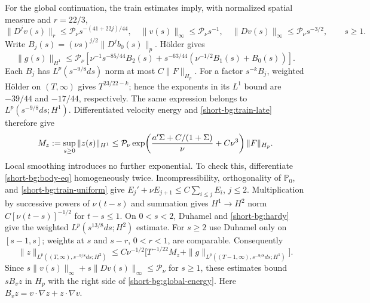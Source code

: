 For the global continuation, the train estimates imply, with normalized
spatial measure and $r=22/3$,
\[
 \|D^jv(s)\|_r\le\mathcal P_\nu s^{-(41+22j)/44},\quad
 \|v(s)\|_\infty\le\mathcal P_\nu s^{-1},\quad
 \|Dv(s)\|_\infty\le\mathcal P_\nu s^{-3/2},\qquad s\ge1.
\]
Write $B_j(s)=(\nu s)^{j/2}\|D^jb_0(s)\|_p$. H\"older gives
\begin{equation}
 \|g(s)\|_{H^1}\le\mathcal P_\nu
 [\nu^{-1}s^{-85/44}B_2(s)
       +s^{-63/44}(\nu^{-1/2}B_1(s)+B_0(s))].
 \label{short-bg:tail-source}
\end{equation}
Each $B_j$ has $L^p(s^{-9/8}ds)$ norm at most $C\|F\|_{H_p}$.
For a factor $s^{-k}B_j$, weighted H\"older on $(T,\infty)$ gives
$T^{23/22-k}$; hence the exponents in its $L^1$ bound are
$-39/44$ and $-17/44$, respectively. The same expression belongs to
$L^p(s^{-9/8}ds;H^1)$. Differentiated velocity energy and
\eqref{short-bg:train-late} therefore give
\begin{equation}
 M_z:=\sup_{s\ge0}\|z(s)\|_{H^1}
 \le\mathcal P_\nu
 \exp\!\left({a'\Sigma+C/(1+\Sigma)\over\nu}+C\nu^3\right)
 \|F\|_{H_p}.
 \label{short-bg:global-energy}
\end{equation}
Local smoothing introduces no further exponential. To check this,
differentiate \eqref{short-bg:body-eq} homogeneously twice. Incompressibility,
orthogonality of $\mathbb P_0$, and \eqref{short-bg:train-uniform} give
$E_j'+\nu E_{j+1}\le C\sum_{i\le j}E_i$, $j\le2$.
Multiplication by successive powers of $\nu(t-s)$ and summation
gives $H^1\to H^2$ norm $C[\nu(t-s)]^{-1/2}$ for $t-s\le1$.
On $0<s<2$, Duhamel and \eqref{short-bg:hardy} give the weighted
$L^p(s^{13/8}ds;H^2)$ estimate. For $s\ge2$ use Duhamel only on
$[s-1,s]$; weights at $s$ and $s-r$, $0<r<1$, are comparable.
Consequently
\[
 \|z\|_{L^p((T,\infty),s^{-9/8}ds;H^2)}
 \le C\nu^{-1/2}\bigl[T^{-1/22}M_z
             +\|g\|_{L^p((T-1,\infty),s^{-9/8}ds;H^1)}\bigr].
\]
Since $s\|v(s)\|_\infty+s\|Dv(s)\|_\infty\le\mathcal P_\nu$
for $s\ge1$, these estimates bound $sB_vz$ in $H_p$ with the right
side of \eqref{short-bg:global-energy}. Here
$B_vz=v\cdot\nabla z+z\cdot\nabla v$.

